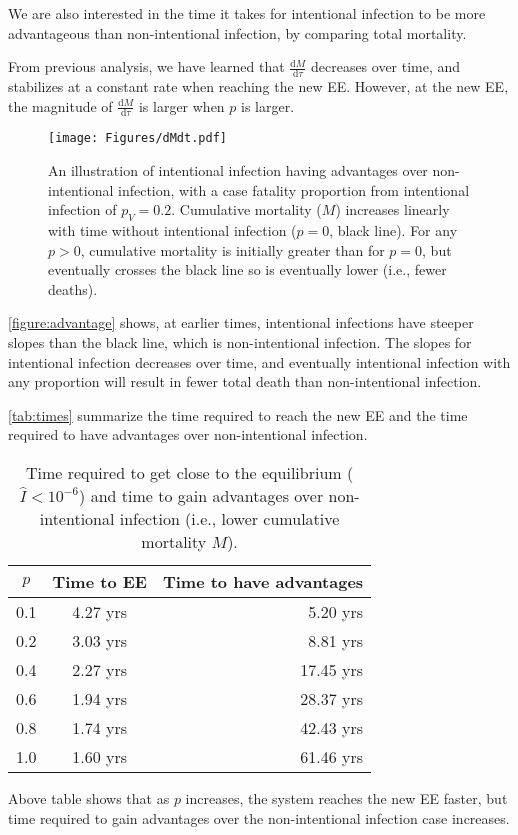 \documentclass[12pt]{article}
\newcommand\dbyd[2]{\frac{\mathrm d{#1}}{\mathrm d{#2}}}
\newcommand{\pmV}{p_{V}}
\begin{document}
We are also interested in the time it takes for intentional infection to be more advantageous than non-intentional infection, by comparing total mortality.

From previous analysis, we have learned that $\dbyd{M}{\tau}$ decreases over time, and stabilizes at a constant rate when reaching the new EE. However, at the new EE, the magnitude of $\dbyd{M}{\tau}$ is larger when $p$ is larger.

\begin{figure}[H]
  \centering
  \texttt{[image: Figures/dMdt.pdf]}
  \caption{An illustration of intentional infection having advantages over non-intentional infection, with a case fatality proportion from intentional infection of $\pmV=0.2$.
Cumulative mortality ($M$) increases linearly with time without intentional infection ($p=0$, black line).
For any $p>0$, cumulative mortality is initially greater than for $p=0$, but eventually crosses the black line so is eventually lower (i.e., fewer deaths).}
\label{figure:advantage}
\end{figure}

\autoref{figure:advantage} shows, at earlier times, intentional infections have steeper slopes than the black line, which is non-intentional infection. The slopes for intentional infection decreases over time, and eventually intentional infection with any proportion will result in fewer total death than non-intentional infection.

\autoref{tab:times} summarize the time required to reach the new EE and the time required to have advantages over non-intentional infection.

\begin{table}[H]
\begin{center}
\caption{Time required to get close to the equilibrium ($\hat{I}<10^{-6}$) and time to gain advantages over non-intentional infection (i.e., lower cumulative mortality $M$).}
\label{tab:times}
\smallskip
\begin{tabular}{c|c|r}
{\bfseries $p$} & {\bfseries Time to EE} & {\bfseries Time to have advantages} \\\hline
0.1 & 4.27 yrs & 5.20 yrs \\
0.2 & 3.03 yrs & 8.81 yrs \\
0.4 & 2.27 yrs & 17.45 yrs \\
0.6 & 1.94 yrs & 28.37 yrs \\
0.8 & 1.74 yrs & 42.43 yrs \\
1.0 & 1.60 yrs & 61.46 yrs
\end{tabular}
\end{center}
\end{table}
Above table shows that as $p$ increases, the system reaches the new EE faster, but time required to gain advantages over the non-intentional infection case increases.
\end{document}
